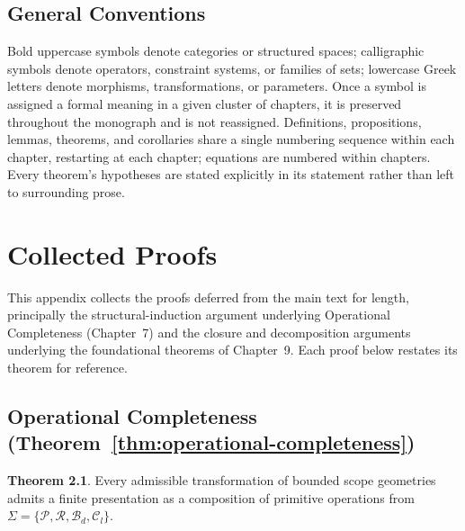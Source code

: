 \documentclass[11pt,twoside,openright]{book}
\numberwithin{equation}{chapter}
\theoremstyle{definition}
\theoremstyle{plain}
\theoremstyle{remark}
\theoremstyle{definition}
\newtheorem*{theorem*}{Theorem}
\newcommand{\Alphabet}{\Sigma}
\newcommand{\Pop}{\mathcal{P}}
\newcommand{\Refuse}{\mathcal{R}}
\newcommand{\Bind}{\mathcal{B}_d}
\newcommand{\Collapse}{\mathcal{C}_l}
\newcommand{\ScopeAlphabet}{\Alphabet=\{\Pop,\Refuse,\Bind,\Collapse\}}
\begin{document}
\section{General Conventions}

Bold uppercase symbols denote categories or structured spaces;
calligraphic symbols denote operators, constraint systems, or families of
sets; lowercase Greek letters denote morphisms, transformations, or
parameters. Once a symbol is assigned a formal meaning in a given cluster
of chapters, it is preserved throughout the monograph and is not
reassigned. Definitions, propositions, lemmas, theorems, and corollaries
share a single numbering sequence within each chapter, restarting at each
chapter; equations are numbered within chapters. Every theorem's
hypotheses are stated explicitly in its statement rather than left to
surrounding prose.

\chapter{Collected Proofs}
\label{app:proofs}

This appendix collects the proofs deferred from the main text for length,
principally the structural-induction argument underlying Operational
Completeness (Chapter~7) and the closure and decomposition arguments
underlying the foundational theorems of Chapter~9. Each proof below
restates its theorem for reference.

\section{Operational Completeness (Theorem~\ref{thm:operational-completeness})}

\begin{theorem*}
Every admissible transformation of bounded scope geometries admits a
finite presentation as a composition of primitive operations from
$\ScopeAlphabet$.
\end{theorem*}
\end{document}
